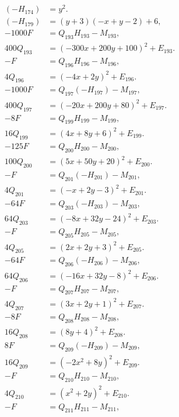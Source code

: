 \documentclass[11pt]{article}
\begin{document}
\begin{align}
(-H_{174})&=y^2.\label{eq:sign174}\\
(-H_{179})&=(y+3)(-x+y-2)+6,\label{eq:sign179}\\
-1000F&=Q_{193}H_{193}-M_{193},\label{eq:sign193}\\
400Q_{193}&=(-300x+200y+100)^2+E_{193}.\label{eq:sign193b}\\
-F&=Q_{196}H_{196}-M_{196},\label{eq:sign196}\\
4Q_{196}&=(-4x+2y)^2+E_{196}.\label{eq:sign196b}\\
-1000F&=Q_{197}(-H_{197})-M_{197},\label{eq:sign197}\\
400Q_{197}&=(-20x+200y+80)^2+E_{197}.\label{eq:sign197b}\\
-8F&=Q_{199}H_{199}-M_{199},\label{eq:sign199}\\
16Q_{199}&=(4x+8y+6)^2+E_{199}.\label{eq:sign199b}\\
-125F&=Q_{200}H_{200}-M_{200},\label{eq:sign200}\\
100Q_{200}&=(5x+50y+20)^2+E_{200}.\label{eq:sign200b}\\
-F&=Q_{201}(-H_{201})-M_{201},\label{eq:sign201}\\
4Q_{201}&=(-x+2y-3)^2+E_{201}.\label{eq:sign201b}\\
-64F&=Q_{203}(-H_{203})-M_{203},\label{eq:sign203}\\
64Q_{203}&=(-8x+32y-24)^2+E_{203}.\label{eq:sign203b}\\
-F&=Q_{205}H_{205}-M_{205},\label{eq:sign205}\\
4Q_{205}&=(2x+2y+3)^2+E_{205}.\label{eq:sign205b}\\
-64F&=Q_{206}(-H_{206})-M_{206},\label{eq:sign206}\\
64Q_{206}&=(-16x+32y-8)^2+E_{206}.\label{eq:sign206b}\\
-F&=Q_{207}H_{207}-M_{207},\label{eq:sign207}\\
4Q_{207}&=(3x+2y+1)^2+E_{207}.\label{eq:sign207b}\\
-8F&=Q_{208}H_{208}-M_{208},\label{eq:sign208}\\
16Q_{208}&=(8y+4)^2+E_{208}.\label{eq:sign208b}\\
8F&=Q_{209}(-H_{209})-M_{209},\label{eq:sign209}\\
16Q_{209}&=(-2x^{2}+8y)^2+E_{209}.\label{eq:sign209b}\\
-F&=Q_{210}H_{210}-M_{210},\label{eq:sign210}\\
4Q_{210}&=(x^{2}+2y)^2+E_{210}.\label{eq:sign210b}\\
-F&=Q_{211}H_{211}-M_{211},\label{eq:sign211}\\

\end{align}
\end{document}
